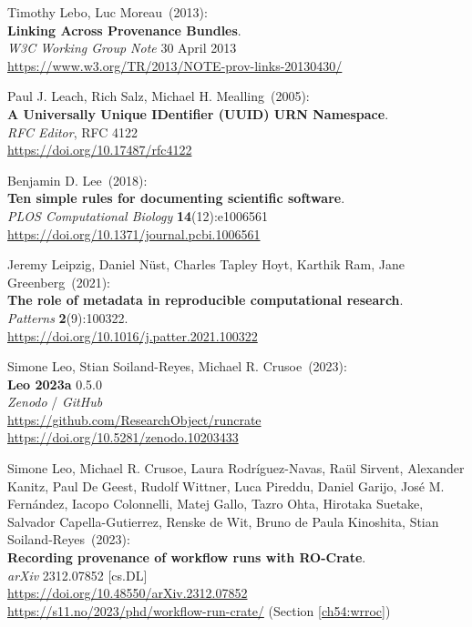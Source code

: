 \begin{thebibliography}{9}
Timothy Lebo, Luc Moreau~(2013): \\
\textbf{Linking {Across Provenance Bundles}}.\\
\emph{W3C Working Group Note} 30 April 2013 \\
\url{https://www.w3.org/TR/2013/NOTE-prov-links-20130430/}

Paul J. Leach, Rich Salz, Michael H. Mealling~(2005): \\
\textbf{A Universally Unique IDentifier (UUID) URN Namespace}. \\
\emph{RFC Editor}, RFC 4122 \\
\url{https://doi.org/10.17487/rfc4122}

Benjamin D. Lee~(2018):\\
\textbf{Ten simple rules for documenting scientific software}.\\
\emph{PLOS Computational Biology} \textbf{14}(12):e1006561\\
\url{https://doi.org/10.1371/journal.pcbi.1006561}

Jeremy Leipzig, Daniel Nüst, Charles Tapley Hoyt, Karthik Ram, Jane Greenberg~(2021): \\
\textbf{The role of metadata in reproducible computational research}.\\
\emph{Patterns} \textbf{2}(9):100322.\\
\url{https://doi.org/10.1016/j.patter.2021.100322}

Simone Leo, Stian Soiland-Reyes, Michael R. Crusoe~(2023): \\
\textbf{Leo 2023a} 0.5.0\\
\emph{Zenodo} / \emph{GitHub}\\
\url{https://github.com/ResearchObject/runcrate}\\
\url{https://doi.org/10.5281/zenodo.10203433}

Simone Leo, Michael R. Crusoe, Laura Rodríguez-Navas, Raül Sirvent, Alexander Kanitz, Paul De Geest, Rudolf Wittner, Luca Pireddu, Daniel Garijo, José M. Fernández, Iacopo Colonnelli, Matej Gallo, Tazro Ohta, Hirotaka Suetake, Salvador Capella-Gutierrez, Renske de Wit, Bruno de Paula Kinoshita, Stian Soiland-Reyes~(2023): \\
\textbf{Recording provenance of workflow runs with RO-Crate}.\\
\emph{arXiv} 2312.07852 [cs.DL] \\
\url{https://doi.org/10.48550/arXiv.2312.07852}\\
\url{https://s11.no/2023/phd/workflow-run-crate/} 
(Section \vref{ch54:wrroc})


\end{thebibliography}
